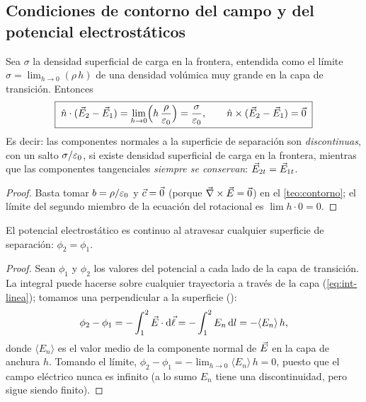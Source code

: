 \subsection{Condiciones de contorno del campo y del potencial electrostáticos}\label{sec:contorno-electrico}
\begin{corolario}\label{cor:contorno-E}
Sea $\sigma$ la densidad superficial de carga en la frontera, entendida como el límite $\sigma=\lim_{h\to0}(\rho\,h)$ de una densidad volúmica
muy grande en la capa de transición. Entonces
\begin{equation}\label{eq:contorno-E}
  \boxed{\;\hat{n}\cdot(\vec{E}_2-\vec{E}_1)=\lim_{h\to0}\Bigl(h\,\frac{\rho}{\varepsilon_{0}}\Bigr)=\frac{\sigma}{\varepsilon_{0}},\qquad
  \hat{n}\times(\vec{E}_2-\vec{E}_1)=\vec{0}\;}
\end{equation}
Es decir: las componentes normales a la superficie de separación son \emph{discontinuas}, con un salto $\sigma/\varepsilon_{0}$, si existe densidad superficial de carga en la
frontera, mientras que las componentes tangenciales \emph{siempre se conservan}: $\vec{E}_{2t}=\vec{E}_{1t}$.
\end{corolario}
\begin{proof}
Basta tomar $b=\rho/\varepsilon_{0}$ y $\vec{c}=\vec{0}$ (porque $\vec{\nabla}\times\vec{E}=\vec{0}$) en el \cref{teo:contorno}; el límite del segundo miembro de la ecuación del rotacional es $\lim h\cdot0=0$.
\end{proof}

\begin{corolario}\label{cor:contorno-phi}
El potencial electrostático es continuo al atravesar cualquier superficie de separación: $\phi_2=\phi_1$.
\end{corolario}
\begin{proof}
Sean $\phi_1$ y $\phi_2$ los valores del potencial a cada lado de la capa de transición. La integral puede hacerse sobre cualquier trayectoria a través de la capa
(\cref{eq:int-linea}); tomamos una perpendicular a la superficie ():
\[
  \phi_2-\phi_1=-\int_{1}^{2}\vec{E}\cdot\mathrm{d}\vec{\ell}=-\int_{1}^{2}E_n\,\mathrm{d} l=-\langle E_n\rangle\,h,
\]
donde $\langle E_n\rangle$ es el valor medio de la componente normal de $\vec{E}$ en la capa de anchura $h$. Tomando el límite,
$\phi_2-\phi_1=-\lim_{h\to0}\langle E_n\rangle\,h=0$, puesto que el campo eléctrico nunca es infinito (a lo sumo $E_n$ tiene una discontinuidad, pero sigue siendo finito).
\end{proof}

